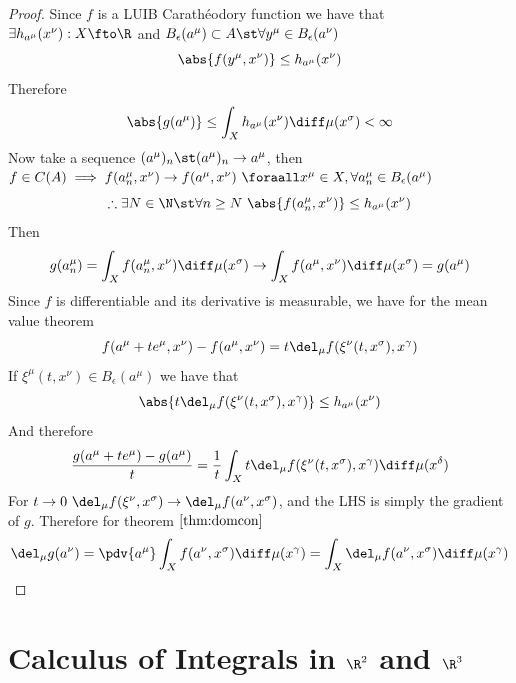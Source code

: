 \documentclass[../mmf.tex]{subfiles}
\begin{document}
\begin{proof}
	Since $f$ is a LUIB Carathéodory function we have that $\exists h_{a^\mu}(x^\nu):X\fto\R$ and $B_\epsilon(a^\mu)\subset A\st\forall y^\mu\in B_\epsilon(a^\nu)$
	\begin{equation*}
		\abs{f(y^\mu,x^\nu)}\le h_{a^\mu}(x^\nu)
	\end{equation*}
	Therefore
	\begin{equation*}
		\abs{g(a^\mu)}\le\int_{X}^{}h_{a^\mu}(x^\nu)\diff\mu(x^\sigma)<\infty
	\end{equation*}
	Now take a sequence $(a^\mu)_n\st (a^\mu)_n\to a^\mu$, then $f\in C(A)\implies{} f(a^\mu_n,x^\nu)\to f(a^\mu,x^\nu)\ \foraall x^\mu\in X,\forall a^\mu_n\in B_\epsilon(a^\mu)$
	\begin{equation*}
		\therefore\exists N\in\N\st\forall n\ge N\ \abs{f(a^\mu_n,x^\nu)}\le h_{a^\mu}(x^\nu)
	\end{equation*}
	Then
	\begin{equation*}
		g(a^\mu_n)=\int_{X}^{}f(a^\mu_n,x^\nu)\diff\mu(x^\sigma)\to\int_{X}^{}f(a^\mu,x^\nu)\diff\mu(x^\sigma)=g(a^\mu)
	\end{equation*}
	Since $f$ is differentiable and its derivative is measurable, we have for the mean value theorem
	\begin{equation*}
		f(a^\mu+te^\mu,x^\nu)-f(a^\mu,x^\nu)=t\del_\mu f(\xi^\nu(t,x^\sigma),x^\gamma)
	\end{equation*}
	If $\xi^\mu(t,x^\nu)\in B_\epsilon(a^\mu)$ we have that
	\begin{equation*}
		\abs{t\del_\mu f(\xi^\nu(t,x^\sigma),x^\gamma)}\le h_{a^\mu}(x^\nu)
	\end{equation*}
	And therefore
	\begin{equation*}
		\frac{g(a^\mu+te^\mu)-g(a^\mu)}{t}=\frac{1}{t}\int_{X}^{}t\del_\mu f(\xi^\nu(t,x^\sigma),x^\gamma)\diff\mu(x^\delta)
	\end{equation*}
	For $t\to0\ \del_\mu f(\xi^\nu,x^\sigma)\to\del_\mu f(a^\nu,x^\sigma)$, and the LHS is simply the gradient of $g$. Therefore for theorem $\eqref{thm:domcon}$
	\begin{equation*}
		\del_\mu g(a^\nu)=\pdv{a^\mu}\int_{X}f(a^\nu,x^\sigma)\diff\mu(x^\gamma)=\int_{X}^{}\del_{\mu}f(a^\nu,x^\sigma)\diff\mu(x^\gamma)
	\end{equation*}
\end{proof}
\section{Calculus of Integrals in $\R^2$ and $\R^3$}
\end{document}
